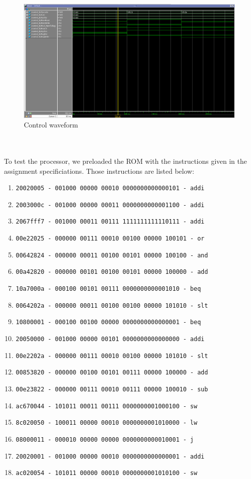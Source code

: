 \documentclass{article}
\begin{document}
\\ \\
\begin{figure}[!ht]
	\centering
		\includegraphics[width=1\textwidth]{control_waveform.png}
		\caption{Control waveform}
\end{figure}
\\ \\

To test the processor, we preloaded the ROM with the instructions given in the assignment specificiations. Those instructions are listed below: 
\begin{enumerate}
	\item \texttt{20020005 - 001000 00000 00010 0000000000000101 - addi} 
	\item \texttt{2003000c - 001000 00000 00011 0000000000001100 - addi} 
	\item \texttt{2067fff7 - 001000 00011 00111 1111111111110111 - addi} 
	\item \texttt{00e22025 - 000000 00111 00010 00100 00000 100101 - or}
	\item \texttt{00642824 - 000000 00011 00100 00101 00000 100100 - and}
	\item \texttt{00a42820 - 000000 00101 00100 00101 00000 100000 - add}
	\item \texttt{10a7000a - 000100 00101 00111 0000000000001010 - beq}
	\item \texttt{0064202a - 000000 00011 00100 00100 00000 101010 - slt}
	\item \texttt{10800001 - 000100 00100 00000 0000000000000001 - beq}
	\item \texttt{20050000 - 001000 00000 00101 0000000000000000 - addi}
	\item \texttt{00e2202a - 000000 00111 00010 00100 00000 101010 - slt}
	\item \texttt{00853820 - 000000 00100 00101 00111 00000 100000 - add}
	\item \texttt{00e23822 - 000000 00111 00010 00111 00000 100010 - sub}
	\item \texttt{ac670044 - 101011 00011 00111 0000000001000100 - sw}
	\item \texttt{8c020050 - 100011 00000 00010 0000000001010000 - lw}
	\item \texttt{08000011 - 000010 00000 00000 0000000000010001 - j}
	\item \texttt{20020001 - 001000 00000 00010 0000000000000001 - addi}
	\item \texttt{ac020054 - 101011 00000 00010 0000000001010100 - sw}
\end{enumerate}
\end{document}
